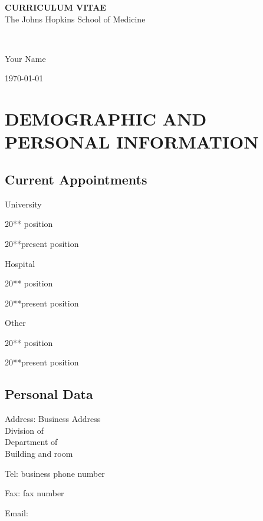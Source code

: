 \documentclass[11pt]{article}
\newenvironment{lyxlist}[1]
	{\begin{list}{}
		{\setlength\itemsep{-0.5ex}
		\settowidth{\labelwidth}{#1}
		 \setlength{\leftmargin}{\labelwidth}
		 \addtolength{\leftmargin}{\labelsep}
		 \renewcommand{\makelabel}[1]{##1\hfil}}}
	{\end{list}}
\newcommand{\mylift}[1]{\vspace*{#1}}
\def\myname{Your Name}
\begin{document}
\begin{center}
{\bf CURRICULUM VITAE}\\
The Johns Hopkins School of Medicine\\
\end{center}

\begin{minipage}[t]{0.3\textwidth}
  \centering{}\\
  \mylift{-1.7em}
  \begin{flushleft}\myname\end{flushleft}
\end{minipage}
\begin{minipage}[t]{0.65\textwidth}
  \hfill\today
\end{minipage}

\section*{DEMOGRAPHIC AND PERSONAL INFORMATION}

\subsection*{Current Appointments}

\begin{lyxlist}{0000-present}
\item [{\textcolor{color1}{University}}]
\item [{20{*}{*}\textendash 20{*}{*}}] position
\item [{20{*}{*}\textendash present}] position

\item [{\textcolor{color1}{Hospital}}]
\item [{20{*}{*}\textendash 20{*}{*}}] position
\item [{20{*}{*}\textendash present}] position

\item [{\textcolor{color1}{Other}}]
\item [{20{*}{*}\textendash 20{*}{*}}] position
\item [{20{*}{*}\textendash present}] position

\end{lyxlist}

\subsection*{Personal Data}
\begin{lyxlist}{0000-present}
\item[{Address:}] Business Address\\
Division of\\
Department of\\  
Building and room
\item[{Tel:}]business phone number
\item[{Fax:}]fax number
\item[{Email:}]\href{mailto:}{}
\end{lyxlist}
\end{document}
